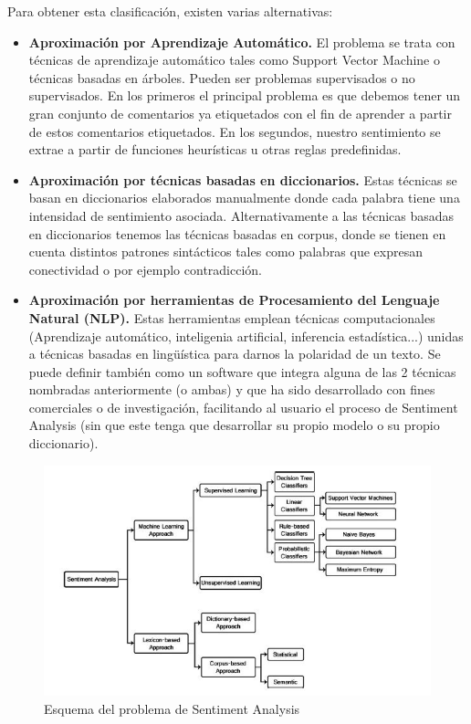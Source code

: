 \documentclass{article}
\begin{document}
Para obtener esta clasificación, existen varias alternativas:
\begin{itemize}
	\item \textbf{Aproximación por Aprendizaje Automático.} El problema se trata con técnicas de aprendizaje automático tales como Support Vector Machine o técnicas basadas en árboles. Pueden ser problemas supervisados o no supervisados. En los primeros el principal problema es que debemos tener un gran conjunto de comentarios ya etiquetados con el fin de aprender a partir de estos comentarios etiquetados. En los segundos, nuestro sentimiento se extrae a partir de funciones heurísticas u otras reglas predefinidas.
	\item \textbf{Aproximación por técnicas basadas en diccionarios.} Estas técnicas se basan en diccionarios elaborados manualmente donde cada palabra tiene una intensidad de sentimiento asociada. Alternativamente a las técnicas basadas en diccionarios tenemos las técnicas basadas en corpus, donde se tienen en cuenta distintos patrones sintácticos tales como palabras que expresan conectividad o por ejemplo contradicción.
	\item  \textbf{Aproximación por herramientas de Procesamiento del Lenguaje Natural (NLP).} Estas herramientas emplean técnicas computacionales (Aprendizaje automático, inteligenia artificial, inferencia estadística...) unidas a técnicas basadas en lingüística para darnos la polaridad de un texto. Se puede definir también como un software que integra alguna de las 2 técnicas nombradas anteriormente (o ambas) y que ha sido desarrollado con fines comerciales o de investigación, facilitando al usuario el proceso de Sentiment Analysis (sin que este tenga que desarrollar su propio modelo o su propio diccionario).
\end{itemize}

\begin{figure}
	\centering
	\includegraphics[width=0.7\linewidth]{clasificationScheme}
	\caption{Esquema del problema de Sentiment Analysis}
	\label{fig:clasificationscheme}
\end{figure}
\end{document}

